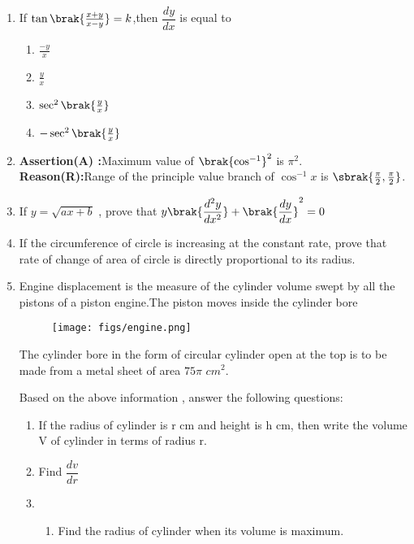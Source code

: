 \begin{enumerate}
	\item If $\tan \brak{\frac{x+y}{x-y}}=k$,then $\dfrac{dy}{dx}$ is equal to 
		\begin{enumerate}
			\item $\frac{-y}{x}$
   \item $\frac{y}{x}$
			
			\item $\sec^{2}\brak{\frac{y}{x}}$ 
   \item $-\sec^{2}\brak{\frac{y}{x}}$ 
			
   \end{enumerate}
  \item  \textbf{Assertion(A) :}Maximum value of $\brak{{\cos^{-1}}}^2$ is ${{\pi}^2}$.\\
  \textbf{Reason(R):}Range of the principle value branch of ${{\cos^{-1}x}}$ is $\sbrak{{\frac{\pi}{2}},{\frac{\pi}{2}}}$.
	\item If $y=\sqrt{ax+b}$ , prove that $y\brak{\dfrac{d^2y}{dx^2}}+\brak{\dfrac{dy}{dx}}^2=0$ 
 \item If the circumference of circle is increasing at the constant rate, prove that rate of change of area of circle is directly proportional to its radius.
 \newpage
 \item Engine displacement is the measure of the cylinder volume swept by all the pistons of a piston engine.The piston moves inside the cylinder bore  
  \begin{figure}[!h]
	  \begin{center}
\texttt{[image: figs/engine.png]}
	  \end{center}
\caption{}
\label{fig:engine}
\end{figure}
    

 The cylinder bore in the form of circular cylinder open at the top is to be made from a metal sheet of area ${75\pi}$ ${cm}^2.$ \newline

 Based on the above information , answer the following questions: 

 \begin{enumerate}[label=(\roman*)]

     \item  If the radius of cylinder is r cm and height is h cm, then write the volume V of cylinder in terms of radius r. 
     \item Find $\dfrac{dv}{dr}$ 
     
     \item 
	     \begin{enumerate}[label=(\alph*)]
     \item Find the radius of cylinder when its volume is maximum. 
   

\end{enumerate}
\end{enumerate}
\end{enumerate}
